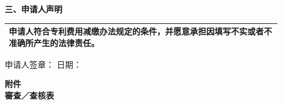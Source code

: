 \documentclass[UTF8,10pt,a4paper,fontset=fandol]{ctexart}
\begin{document}
\vspace{0.6em}

\noindent
\textbf{三、申请人声明}

\begin{tabular}{|p{0.92\linewidth}|}
\hline
申请人符合专利费用减缴办法规定的条件，并愿意承担因填写不实或者不准确所产生的法律责任。\\
\hline
\end{tabular}

\vspace{0.5em}

\noindent
申请人签章：\hspace{3cm}
日期：\hspace{2cm}


\newpage

\begin{center}
\textbf{附件}\\[2pt]
\textbf{審查／查核表}
\end{center}
\end{document}
